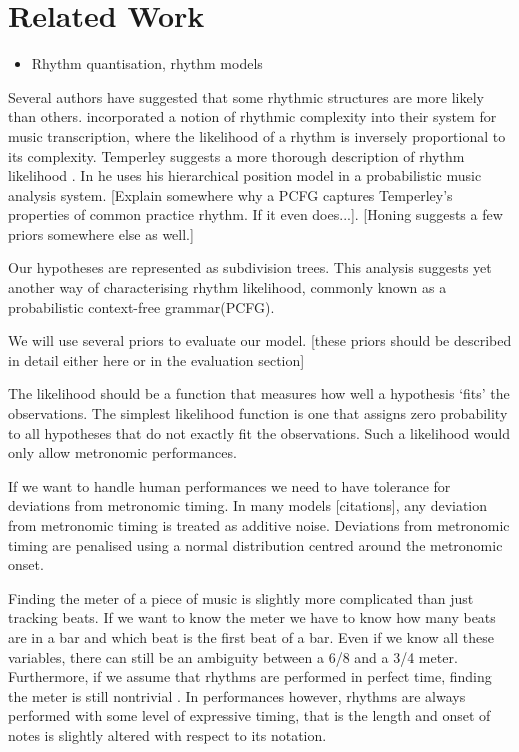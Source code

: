 \chapter{Related Work}
\label{sec:relatedwork}

\begin{itemize}
\item Rhythm quantisation, rhythm models
\end{itemize}


Several authors have suggested that some rhythmic structures are more likely than others. \cite{cemgil2000rhythm} incorporated a notion of rhythmic complexity into their system for music transcription, where the likelihood of a rhythm is inversely proportional to its complexity. Temperley suggests a more thorough description of rhythm likelihood \citep{temperley2010modeling}. In \cite{temperley2009unified} he uses his hierarchical position model in a probabilistic music analysis system. [Explain somewhere why a PCFG captures Temperley's properties of common practice rhythm. If it even does...]. [Honing suggests a few priors somewhere else as well.]

Our hypotheses are represented as subdivision trees. This analysis suggests yet another way of characterising rhythm likelihood, commonly known as a probabilistic context-free grammar(PCFG). 

We will use several priors to evaluate our model. [these priors should be described in detail either here or in the evaluation section]

The likelihood should be a function that measures how well a hypothesis `fits' the observations. The simplest likelihood function is one that assigns zero probability to all hypotheses that do not exactly fit the observations. Such a likelihood would only allow metronomic performances. 

If we want to handle human performances we need to have tolerance for deviations from metronomic timing. In many models [citations], any deviation from metronomic timing is treated as additive noise. Deviations from metronomic timing are penalised using a normal distribution centred around the metronomic onset.

Finding the meter of a piece of music is slightly more complicated than just tracking beats. If we want to know the meter we have to know how many beats are in a bar and which beat is the first beat of a bar. Even if we know all these variables, there can still be an ambiguity between a 6/8 and a 3/4 meter. Furthermore, if we assume that rhythms are performed in perfect time, finding the meter is still nontrivial \cite{temperley2010modeling}. In performances however, rhythms are always performed with some level of expressive timing, that is the length and onset of notes is slightly altered with respect to its notation.

